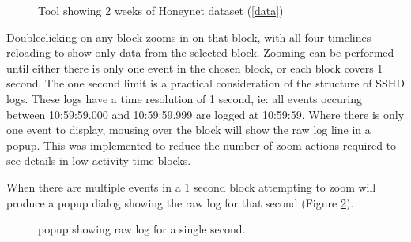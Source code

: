 \begin{figure}[tbh!]
\caption{\protect\label{zoomed_in}Tool showing 2 weeks of Honeynet dataset (\ref{data})}
\end{figure}

Doubleclicking on any block zooms in on that block, with all four timelines reloading to show only data from the selected block. 
Zooming can be performed until either there is only one event in the chosen block, or each block covers 1 second. The one second limit is a practical consideration of the structure of SSHD logs. These logs have a time resolution of 1 second, ie:  all events occuring between 10:59:59.000 and 10:59:59.999 are logged at 10:59:59. Where there is only one event to display, mousing over the block will show the raw log line in a popup. This was implemented to reduce the number of zoom actions required to see details in low activity time blocks.

When there are multiple events in a 1 second block attempting to zoom will produce a popup dialog showing the raw log for that second (Figure \ref{des_one_second}).

\begin{figure}[tbh]
\caption{\protect\label{des_one_second}popup showing raw log for a single second.}
\end{figure}

